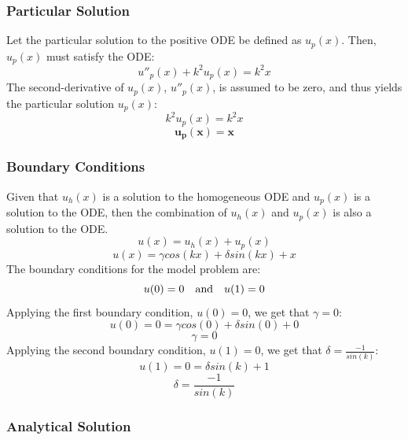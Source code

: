 \documentclass[10pt, reqno]{article}		%
\numberwithin{equation}{section}
\begin{document}
\subsubsection{Particular Solution}

Let the particular solution to the positive ODE be defined as $u_p(x)$. Then, $u_p(x)$ must satisfy the ODE:
\begin{equation}
u''_p(x) + k^2u_p(x) = k^2x
\end{equation}
The second-derivative of $u_p(x)$, $u''_p(x)$, is assumed to be zero, and thus yields the particular solution $u_p(x)$:
\begin{equation}
k^2u_p(x) = k^2x
\end{equation}
\begin{equation}
\mathbf{u_p(x) = x}
\end{equation}

\subsubsection{Boundary Conditions}

Given that $u_h(x)$ is a solution to the homogeneous ODE and $u_p(x)$ is a solution to the ODE, then the combination of $u_h(x)$ and $u_p(x)$ is also a solution to the ODE.
\begin{equation}
u(x) = u_h(x) + u_p(x)
\end{equation}
\begin{equation}
u(x) = \gamma cos(kx) + \delta sin(kx) + x
\end{equation}
The boundary conditions for the model problem are:
\begin{equation}
u(0) = 0 \quad \textnormal{and} \quad u(1) = 0 
\end{equation}
Applying the first boundary condition, $u(0) = 0$, we get that $\gamma = 0$:
\begin{equation}
u(0) = 0 = \gamma cos(0) + \delta sin(0) + 0
\end{equation}
\begin{equation}
\gamma = 0
\end{equation}
Applying the second boundary condition, $u(1) = 0$, we get that $\delta = \frac{-1}{sin(k)}$:
\begin{equation}
u(1) = 0 = \delta sin(k) + 1
\end{equation}
\begin{equation}
\delta = \frac{-1}{sin(k)}
\end{equation}

\subsubsection{Analytical Solution}
\end{document}
